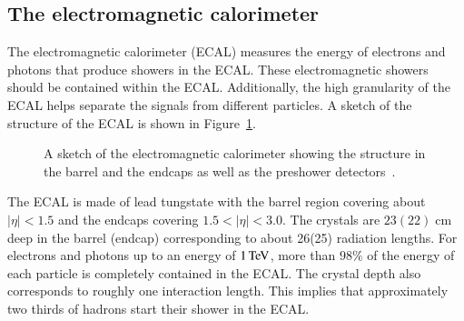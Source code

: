 \subsection{The electromagnetic calorimeter}

The electromagnetic calorimeter (ECAL)\cite{Bayatian:922757} measures the energy of electrons and photons that produce showers in the ECAL.
These electromagnetic showers should be contained within the ECAL. Additionally, the high granularity of the ECAL helps separate the signals from different particles.
A sketch of the structure of the ECAL is shown in Figure~\ref{fig:det_ECAL}.

\begin{figure}[htbp!]
  \begin{center}

\caption{A sketch of the electromagnetic calorimeter showing the structure in the barrel and the endcaps as well as the preshower detectors~\cite{Chatrchyan:2009qm}.
  \label{fig:det_ECAL}}
  \end{center}
\end{figure}

The ECAL is made of lead tungstate with the barrel region covering about $|\eta| < 1.5$ and the endcaps covering $1.5 < |\eta|<3.0$. The crystals are $23 (22)\;\si{\centi \meter}$ deep in the barrel (endcap) corresponding to about 26(25) radiation lengths.
For electrons and photons up to an energy of $1 \,\text{Te\hspace{-.08em}V}$, more than $98  \%$ of the energy of each particle is completely contained in the ECAL.
The crystal depth also corresponds to roughly one interaction length. This implies that approximately two thirds of hadrons start their shower in the ECAL.

